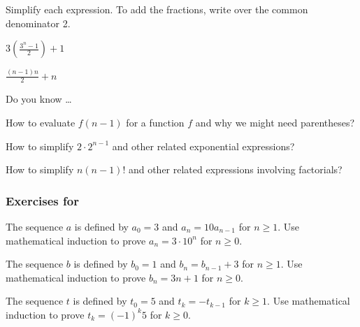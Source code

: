 \begin{exer}[\exerU] %
\label{exer_simplify_ind_alg_frac}
    Simplify each expression.  To add the fractions, write over the common denominator 2.
        \begin{exerpart}
           \item $\displaystyle 3\left( \frac{3^n-1}{2} \right) + 1$
            \item $\displaystyle \frac{(n-1)n}{2} +n$
        \end{exerpart} 
\end{exer}

\begin{exer}[\exerR] %
\label{exer_dyk_fofnminus1_induction}
    Do you know \ldots
        \begin{exerpart}
            \item How to evaluate $f(n-1)$ for a function $f$ and why we might need parentheses?
            \item How to simplify $2\cdot2^{n-1}$ and other related exponential expressions?
            \item How to simplify $n(n-1)!$ and other related expressions involving factorials? 
        \end{exerpart}
\end{exer}


\subsubsection*{Exercises for 
 \subpffindseq}

\begin{exer}[\exerP] %
\label{exer_math_ind_geom}
    The sequence $a$ is defined by $a_0= 3$ and $a_n = 10a_{n-1}$ for $n \ge 1$. Use mathematical induction to prove $a_n = 3\cdot 10^n$ for $n \ge 0$.
\end{exer}

\begin{exer}[\exerP] %
\label{exer_math_ind_arith}
    The sequence $b$ is defined by  $b_0= 1$ and $b_n = b_{n-1} + 3$ for $n \ge 1$. Use mathematical induction to prove $b_n = 3n+1$ for $n \ge 0$.
\end{exer}

\begin{exer}[\exerP] %
\label{exer_math_ind_alt}
    The sequence $t$ is defined by $t_0= 5$ and $t_k = -t_{k-1}$ for $k \ge 1$. Use mathematical induction to prove $t_k = (-1)^k5$ for $k \ge 0$.
\end{exer}

